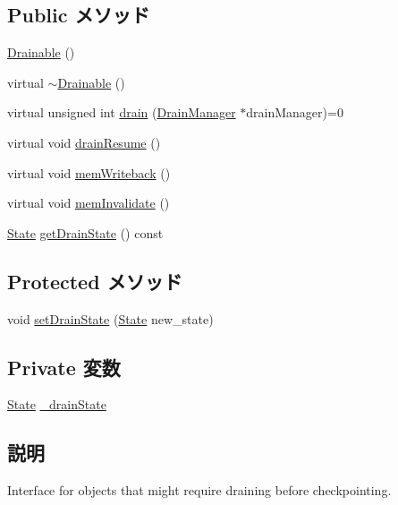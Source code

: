 \subsection*{Public メソッド}
\begin{DoxyCompactItemize}
\item 
\hyperlink{classDrainable_ab7e0a5035cfc2b76d859c266fa9f23ac}{Drainable} ()
\item 
virtual \hyperlink{classDrainable_acbac1c0890f30cd7ed12ce72c755a270}{$\sim$Drainable} ()
\item 
virtual unsigned int \hyperlink{classDrainable_a1ed42c14f2f622ea6b0df3865e89c8b4}{drain} (\hyperlink{classDrainManager}{DrainManager} $\ast$drainManager)=0
\item 
virtual void \hyperlink{classDrainable_a8f020d3237536fe007fc488c4125c5d8}{drainResume} ()
\item 
virtual void \hyperlink{classDrainable_aaec8b1741246cef384bc2743ce21cc34}{memWriteback} ()
\item 
virtual void \hyperlink{classDrainable_a7f243f736712f56d8dd50cd21c77b9d1}{memInvalidate} ()
\item 
\hyperlink{classDrainable_a5d74787dedbc4e11c1ab15bf487e61f8}{State} \hyperlink{classDrainable_a5c95358f0e9355bcc3979baf3fb7307f}{getDrainState} () const 
\end{DoxyCompactItemize}
\subsection*{Protected メソッド}
\begin{DoxyCompactItemize}
\item 
void \hyperlink{classDrainable_ad800905390fe03e850cf996e914038f9}{setDrainState} (\hyperlink{classDrainable_a5d74787dedbc4e11c1ab15bf487e61f8}{State} new\_\-state)
\end{DoxyCompactItemize}
\subsection*{Private 変数}
\begin{DoxyCompactItemize}
\item 
\hyperlink{classDrainable_a5d74787dedbc4e11c1ab15bf487e61f8}{State} \hyperlink{classDrainable_a5aef2a2eb3b798eb214b1e83d6f75275}{\_\-drainState}
\end{DoxyCompactItemize}


\subsection{説明}
Interface for objects that might require draining before checkpointing.

